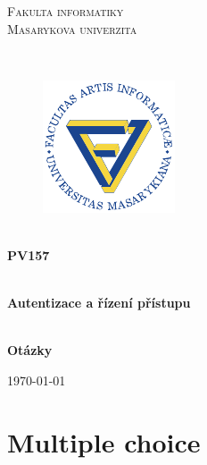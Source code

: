 \documentclass[11pt,a4paper]{article}
\begin{document}

\begin{titlepage}

    \begin{center}
        \vfill {%
            \Huge{%
                \textsc{%
                    Fakulta informatiky\\[3mm]%
                    Masarykova univerzita%
                }%
            }%
        }%

        \hfill\\[15mm]

        \begin{figure}[!h]
            \centering
            \includegraphics[scale=3]{muni-fi-logo.pdf}
        \end{figure}

        \hfill\\[10mm]

        \Huge{
            \textbf{
                PV157
            }
        }

        \hfill\\[-10mm]

        \huge{
            \textbf{
                Autentizace a řízení přístupu
            }
        }

        \hfill\\[10mm]

        \LARGE{
            \textbf{
                Otázky
            }
        }
        \vfill

        \Large{
            \today
        }

    \end{center}
\end{titlepage}

\newpage


\section*{Multiple choice}
\end{document}
